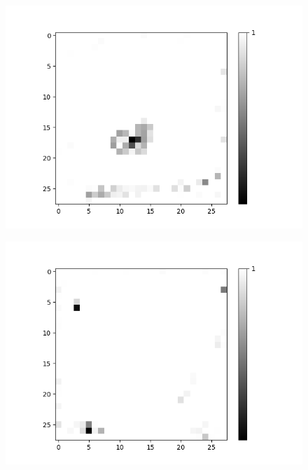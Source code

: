 \begin{figure}[H]
\begin{minipage}[b]{0.19\textwidth}
		\includegraphics[width=\textwidth]{LoAE(AND)(20LF)/False/Feature-10.png}
		\label{}
	\end{minipage}
	\begin{minipage}[b]{0.19\textwidth}
		\captionsetup{labelformat=empty}
		\includegraphics[width=\textwidth]{LoAE(AND)(20LF)/False/Feature-12.png}
		\label{}
	\end{minipage}
	\begin{minipage}[b]{0.19\textwidth}
		\captionsetup{labelformat=empty}

\end{minipage}
\end{figure}
